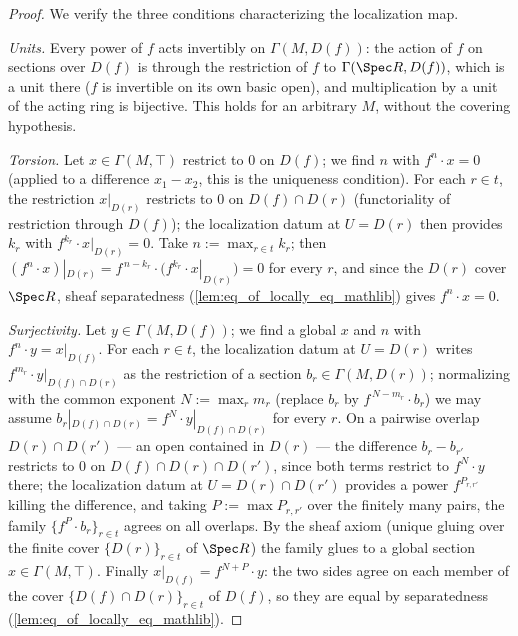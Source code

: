 \begin{proof}
  \leanok
  We verify the three conditions characterizing the localization map.

  \emph{Units.} Every power of \(f\) acts invertibly on \(\Gamma(M, D(f))\): the action
  of \(f\) on sections over \(D(f)\) is through the restriction of \(f\) to
  \(\Gamma(\Spec R, D(f))\), which is a unit there (\(f\) is invertible on its own basic
  open), and multiplication by a unit of the acting ring is bijective. This holds for an
  arbitrary \(M\), without the covering hypothesis.

  \emph{Torsion.} Let \(x \in \Gamma(M, \top)\) restrict to \(0\) on \(D(f)\); we find
  \(n\) with \(f^n \cdot x = 0\) (applied to a difference \(x_1 - x_2\), this is the
  uniqueness condition). For each \(r \in t\), the restriction \(x|_{D(r)}\) restricts to
  \(0\) on \(D(f) \cap D(r)\) (functoriality of restriction through \(D(f)\)); the
  localization datum at \(U = D(r)\) then provides \(k_r\) with
  \(f^{k_r} \cdot x|_{D(r)} = 0\). Take \(n := \max_{r \in t} k_r\); then
  \((f^n \cdot x)|_{D(r)} = f^{\,n-k_r} \cdot \bigl(f^{k_r} \cdot x|_{D(r)}\bigr) = 0\)
  for every \(r\), and since the \(D(r)\) cover \(\Spec R\), sheaf separatedness
  (\cref{lem:eq_of_locally_eq_mathlib}) gives \(f^n \cdot x = 0\).

  \emph{Surjectivity.} Let \(y \in \Gamma(M, D(f))\); we find a global \(x\) and \(n\)
  with \(f^n \cdot y = x|_{D(f)}\). For each \(r \in t\), the localization datum at
  \(U = D(r)\) writes \(f^{m_r} \cdot y|_{D(f) \cap D(r)}\) as the restriction of a
  section \(b_r \in \Gamma(M, D(r))\); normalizing with the common exponent
  \(N := \max_r m_r\) (replace \(b_r\) by \(f^{\,N-m_r} \cdot b_r\)) we may assume
  \(b_r|_{D(f) \cap D(r)} = f^{N} \cdot y|_{D(f) \cap D(r)}\) for every \(r\). On a
  pairwise overlap \(D(r) \cap D(r')\) — an open contained in \(D(r)\) — the difference
  \(b_r - b_{r'}\) restricts to \(0\) on \(D(f) \cap D(r) \cap D(r')\), since both terms
  restrict to \(f^N \cdot y\) there; the localization datum at
  \(U = D(r) \cap D(r')\) provides a power \(f^{P_{r,r'}}\) killing the difference, and
  taking \(P := \max P_{r,r'}\) over the finitely many pairs, the family
  \(\{f^P \cdot b_r\}_{r \in t}\) agrees on all overlaps. By the sheaf axiom (unique
  gluing over the finite cover \(\{D(r)\}_{r \in t}\) of \(\Spec R\)) the family glues to
  a global section \(x \in \Gamma(M, \top)\). Finally
  \(x|_{D(f)} = f^{N+P} \cdot y\): the two sides agree on each member of the cover
  \(\{D(f) \cap D(r)\}_{r \in t}\) of \(D(f)\), so they are equal by separatedness
  (\cref{lem:eq_of_locally_eq_mathlib}).
\end{proof}

